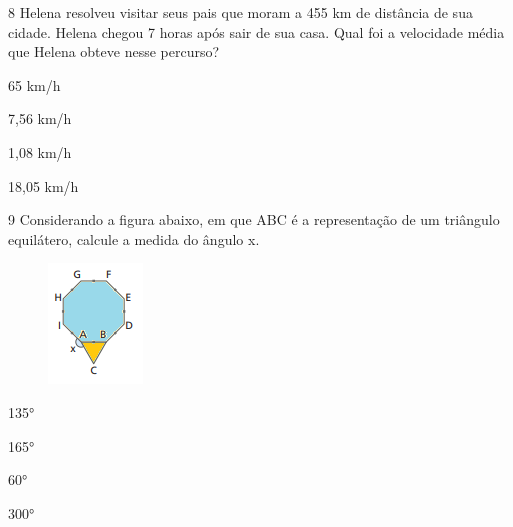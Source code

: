 \num{8} Helena resolveu visitar seus pais que moram a 455 km de distância de
sua cidade. Helena chegou 7 horas após sair de sua casa. Qual foi a
velocidade média que Helena obteve nesse percurso?

\begin{escolha}
\item 65 km/h
\item 7,56 km/h
\item 1,08 km/h
\item 18,05 km/h
\end{escolha}








\num{9} Considerando a figura abaixo, em que ABC é a representação de um
triângulo equilátero, calcule a medida do ângulo x.

\begin{figure}[H]
\centering\includegraphics[width=0.98958in,height=1.26042in]{./imgSAEB_8_MAT/media/image56.png}
\end{figure}


\begin{escolha}
\item 135°
\item 165°
\item 60°
\item 300°
\end{escolha}

